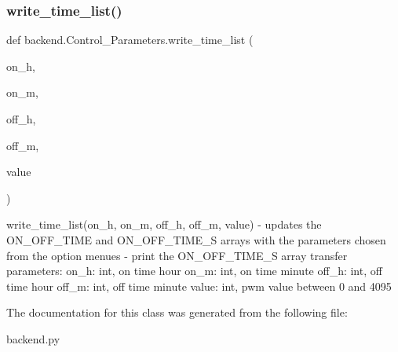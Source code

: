 \subsubsection{\texorpdfstring{write\+\_\+time\+\_\+list()}{write\_time\_list()}}
{\footnotesize\ttfamily def backend.\+Control\+\_\+\+Parameters.\+write\+\_\+time\+\_\+list (\begin{DoxyParamCaption}\item[{}]{on\+\_\+h,  }\item[{}]{on\+\_\+m,  }\item[{}]{off\+\_\+h,  }\item[{}]{off\+\_\+m,  }\item[{}]{value }\end{DoxyParamCaption})}

\begin{DoxyVerb}write_time_list(on_h, on_m, off_h, off_m, value)
    - updates the ON_OFF_TIME and ON_OFF_TIME_S arrays with the parameters chosen from the option menues
    - print the ON_OFF_TIME_S array
transfer parameters:
    on_h:   int, on time hour
    on_m:   int, on time minute
    off_h:  int, off time hour
    off_m:  int, off time minute
    value:  int, pwm value between 0 and 4095
\end{DoxyVerb}
 

The documentation for this class was generated from the following file\+:\begin{DoxyCompactItemize}
\item 
backend.\+py\end{DoxyCompactItemize}

